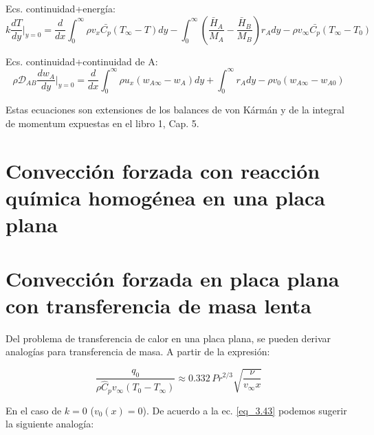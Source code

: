 Ecs. continuidad+energía:
\begin{equation}
    k \frac{dT}{dy} \bigg|_{y=0} = \frac{d}{dx} \int_{0}^{\infty} \rho v_x \bar{C_p} (T_{\infty} - T) dy
    - \int_{0}^{\infty} \left( \frac{\bar{H}_A}{M_A} - \frac{\bar{H}_B}{M_B} \right) r_A dy
    - \rho v_{\infty} \bar{C_p} (T_{\infty} - T_0) 
    \label{3.6}
\end{equation}

Ecs. continuidad+continuidad de A:
\begin{equation}
    \rho \mathscr {D}_{AB} \frac{dw_A}{dy} \bigg|_{y=0} = \frac{d}{dx} \int_{0}^{\infty} \rho u_x (w_{A\infty} - w_A) dy
    + \int_{0}^{\infty} r_A dy - \rho v_{0} (w_{A\infty} - w_{A0})
    \label{3.7}
\end{equation}

Estas ecuaciones son extensiones de los balances de von Kármán y de la integral de momentum expuestas en el libro 1, Cap. 5.

\section{Convección forzada con reacción química homogénea en una placa plana}
\section{Convección forzada en placa plana con transferencia de masa lenta}
Del problema de transferencia de calor en una placa plana, se pueden derivar analogías para transferencia de masa. A partir de la expresión:

\begin{equation}
\frac{q_0}{\rho \hat{C}_p v_\infty (T_0 - T_\infty)} \approx 0.332 \, Pr^{2/3} \sqrt{\frac{\nu}{v_\infty x}}	\tag{3.45}
        \label{eq_3.45}
\end{equation}

En el caso de $k = 0$ ($v_0 (x) = 0$). De acuerdo a la ec. \ref{eq_3.43} podemos sugerir la siguiente analogía:

